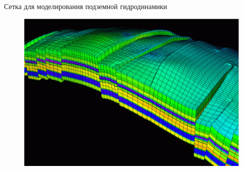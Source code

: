\documentclass[10pt,xcolor=pst,aspectratio=169]{beamer}
\begin{document}
\begin{frame}{Сетка для моделирования подземной гидродинамики}

	\transdissolve[duration=0.1]
	\justifying
	\large

	\begin{figure}
		\includegraphics[width=0.65\linewidth]{oil_grid.eps}
	\end{figure}

\end{frame}
\end{document}
